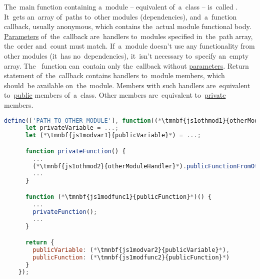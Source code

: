 \enlargethispage{20mm}
\thispagestyle{empty}
\label{amdsyntax}
The~main function containing a~module -- equivalent of~a~class -- is~called .
It~gets an~array of~paths to~other modules (dependencies), and~a~function callback, usually anonymous, which contains the~actual module functional body.
\hyperref[parameterargument]{Parameters} of~the~callback are~handlers to~modules specified in~the~path array, the~order and~count must match.
If~a~module doesn't use any functionality from other modules (it~has no~dependencies), it~isn't necessary to~specify an~empty array.
The~ function can~contain only the~callback without \hyperref[parameterargument]{parameters}.
Return statement of~the~callback contains handlers to~module members, which should~be available on~the~module.
Members with such handlers are~equivalent to~\hyperref[javapublic]{public} members of~a~class.
Other members are~equivalent to~\hyperref[javaprivate]{private} members.
\newpage

\begin{lstlisting}[language=JavaScript]
    define(['PATH_TO_OTHER_MODULE'], function((*\tmnbf{js1othmod1}{otherModuleHandler}*)) {
      let privateVariable = ...;
      let (*\tmnbf{js1modvar1}{publicVariable}*) = ...;

      function privateFunction() {
        ...
        (*\tmnbf{js1othmod2}{otherModuleHandler}*).publicFunctionFromOtherModule();
        ...
      }

      function (*\tmnbf{js1modfunc1}{publicFunction}*)() {
        ...
        privateFunction();
        ...
      }

      return {
        publicVariable: (*\tmnbf{js1modvar2}{publicVariable}*),
        publicFunction: (*\tmnbf{js1modfunc2}{publicFunction}*)
      }
    });
\end{lstlisting}

